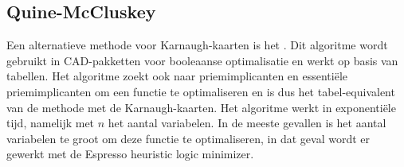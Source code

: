 \subsection{Quine-McCluskey}
Een alternatieve methode voor Karnaugh-kaarten is het . Dit algoritme wordt gebruikt in CAD-pakketten voor booleaanse optimalisatie en werkt op basis van tabellen. Het algoritme zoekt ook naar priemimplicanten en essenti\"ele priemimplicanten om een functie te optimaliseren en is dus het tabel-equivalent van de methode met de Karnaugh-kaarten. Het algoritme werkt in exponenti\"ele tijd, namelijk  met $n$ het aantal variabelen. In de meeste gevallen is het aantal variabelen te groot om deze functie te optimaliseren, in dat geval wordt er gewerkt met de Espresso heuristic logic minimizer.
